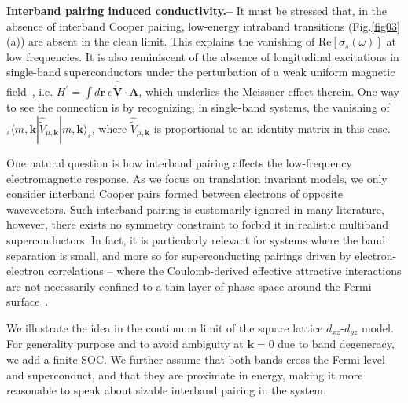 \documentclass[prl,floatfix,twocolumn,showpacs,amsmath,superscriptaddress]{revtex4-2}
\renewcommand{\vec}[1]{\mathbf{#1}}
\newcommand{\vk}{{\vec{k}}}
\begin{document}
{\bf Interband pairing induced conductivity.--} It must be stressed that, in the absence of interband Cooper pairing, low-energy intraband transitions (Fig.\ref{fig03}(a)) are absent in the clean limit. This explains the vanishing of $\text{Re}[\sigma_s(\omega)]$ at low frequencies. It is also reminiscent of the absence of longitudinal excitations in single-band superconductors under the perturbation of a weak uniform magnetic field~\cite{Schrieffer:18}, i.e. $H^\prime = \int d\vec{r}~e\hat{\widetilde{\boldsymbol{V}}}\cdot\vec{A}$, which underlies the Meissner effect therein. One way to see the connection is by recognizing, in single-band systems, the vanishing of $_s\langle \bar{m},\vk | \hat{\widetilde{V}}_{\mu,\vk} |m,\vk\rangle_s$, where $\hat{\widetilde{V}}_{\mu,\vk}$ is proportional to an identity matrix in this case.

One natural question is how interband pairing affects the low-frequency electromagnetic response. As we focus on translation invariant models, we only consider interband Cooper pairs formed between electrons of opposite wavevectors. Such interband pairing is customarily ignored in many literature, however, there exists no symmetry constraint to forbid it in realistic multiband superconductors. In fact, it is particularly relevant for systems where the band separation is small, and more so for superconducting pairings driven by electron-electron correlations -- where the Coulomb-derived effective attractive interactions are not necessarily confined to a thin layer of phase space around the Fermi surface~\cite{Fn2}. 

We illustrate the idea in the continuum limit of the square lattice $d_{xz}$-$d_{yz}$ model. For generality purpose and to avoid ambiguity at $\vec{k}=0$ due to band degeneracy, we add a finite SOC. We further assume that both bands cross the Fermi level and superconduct, and that they are proximate in energy, making it more reasonable to speak about sizable interband pairing in the system. 
\end{document}
